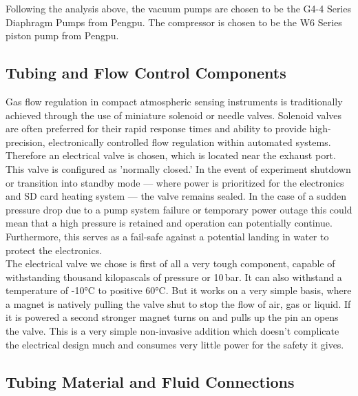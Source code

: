Following the analysis above, the vacuum pumps are chosen to be the G4-4 Series Diaphragm Pumps from Pengpu.
The compressor is chosen to be the W6 Series piston pump from Pengpu.

\subsection{Tubing and Flow Control Components}

Gas flow regulation in compact atmospheric sensing instruments is traditionally achieved through the use of miniature solenoid or needle valves. Solenoid valves are often preferred for their rapid response times and ability to provide high-precision, electronically controlled flow regulation within automated systems.\\
Therefore an electrical valve is chosen, which is located near the exhaust port. This valve is configured as 'normally closed.' In the event of experiment shutdown or transition into standby mode — where power is prioritized for the electronics and SD card heating system — the valve remains sealed. In the case of a sudden pressure drop due to a pump system failure or temporary power outage this could mean that a high pressure is retained and operation can potentially continue. Furthermore, this serves as a fail-safe against a potential landing in water to protect the electronics.\\
The electrical valve we chose is first of all a very tough component, capable of withstanding thousand kilopascals of pressure or 10\,bar. It can also withstand a temperature of -10°C to positive 60°C. But it works on a very simple basis, where a magnet is natively pulling the valve shut to stop the flow of air, gas or liquid. If it is powered a second stronger magnet turns on and pulls up the pin an opens the valve. This is a very simple non-invasive addition which doesn't complicate the electrical design much and consumes very little power for the safety it gives.

\subsection{Tubing Material and Fluid Connections}

